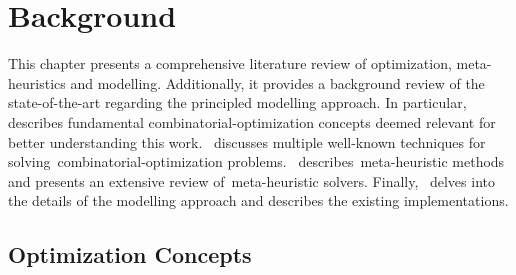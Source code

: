 \chapter{Background}
\label{ch:background}


This chapter presents a comprehensive literature review of optimization,
meta-heuristics and modelling. Additionally, it provides a background review of
the state-of-the-art regarding the principled modelling approach. In
particular,~ describes fundamental
\acrshort{combinatorial-optimization} concepts deemed relevant for better
understanding this work.~ discusses multiple well-known techniques for
solving~\acrshort{combinatorial-optimization}
problems.~ describes~\acrshort{meta-heuristic} methods
and presents an extensive review of~\acrshort{meta-heuristic} solvers.
Finally,~ delves into the details of the modelling approach
and describes the existing implementations.

\section{Optimization Concepts}
\label{sec:optimization-concepts}




